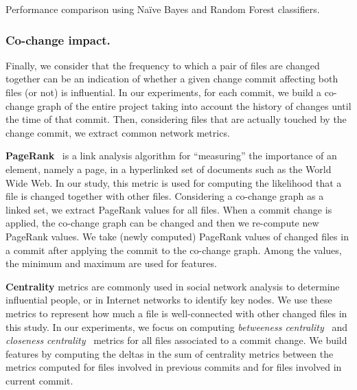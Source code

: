 \begin{table}[!t]
    \caption{Performance comparison using Na\"{i}ve Bayes and Random Forest classifiers.}
    \label{tab:f-measure}
    
\end{table}

\subsubsection{Co-change impact.}
Finally, we consider that the frequency to which a pair of files are changed
together can be an indication of whether a given change commit affecting both
files (or not) is influential.
In our experiments, for each commit, we build a co-change graph of the entire
project taking into account the history of changes until the time of that
commit. Then, considering files that are actually touched by the
change commit, we extract common network metrics.


\textbf{PageRank}~\cite{Brin98} is a link analysis algorithm for ``measuring'' the importance of
an element, namely a page, in a hyperlinked set of documents such as the World Wide Web. In our study, this metric is used for computing the likelihood that a file is changed together with other files.
Considering a co-change graph as a linked set, we extract PageRank values for all files. When a commit change is
applied, the co-change graph can be changed and then we re-compute new PageRank values. We take (newly computed) PageRank values of changed files in a commit after applying the commit to the co-change graph. Among the values, the minimum and maximum are used for features.


\textbf{Centrality} metrics are commonly used in social network analysis to determine influential people,
or in Internet networks to identify key nodes. We use these metrics to represent how much a file is well-connected with other changed files in this study. 
In our experiments, we focus on computing 
{\em betweeness centrality}~\cite{freeman07}
and {\em closeness centrality}~\cite{Sabidussi66} metrics for all files associated to a commit change.
We build features by computing the deltas in the sum of centrality metrics between the
metrics computed for files involved in previous commits and for
files involved in current commit.



